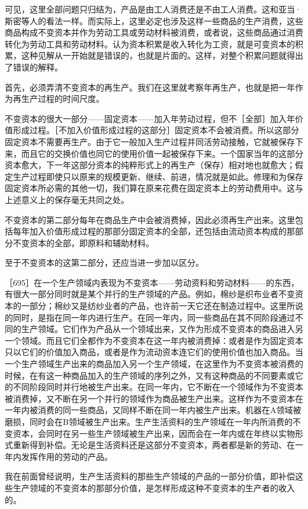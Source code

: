 可见，这里全部问题只归结为，产品是由工人消费还是不由工人消费。这和亚当·斯密等人的看法一样。而实际上，这里必定也涉及这样一些商品的生产消费，这些商品构成不变资本并作为劳动工具或劳动材料被消费，或者说，这些商品通过消费转化为劳动工具和劳动材料。认为资本积累是收入转化为工资，就是可变资本的积累，这种见解从一开始就是错误的，也就是片面的。这样，对整个积累问题就得出了错误的解释。

首先，必须弄清不变资本的再生产。我们在这里就考察年再生产，也就是把一年作为再生产过程的时间尺度。

不变资本的很大一部分——固定资本——加入年劳动过程，但不［全部］加入年价值形成过程。［不加入价值形成过程的这部分］固定资本不会被消费。所以这部分固定资本不需要再生产。由于它一般加入生产过程并同活劳动接触，它就被保存下来，而且它的交换价值也同它的使用价值一起被保存下来。一个国家当年的这部分资本愈大，下一年这部分资本的纯粹形式上的再生产（保存）相对地也就愈大；假定生产过程即使只以原来的规模更新、继续、前进，情况就是如此。修理和为保存固定资本所必需的其他一切，我们算在原来花费在固定资本上的劳动费用中。这与上述意义上的保存毫无共同之处。

不变资本的第二部分每年在商品生产中会被消费掉，因此必须再生产出来。这里包括每年加入价值形成过程的那部分固定资本的全部，还包括由流动资本构成的那部分不变资本的全部，即原料和辅助材料。

至于不变资本的这第二部分，还应当进一步加以区分。

［695］在一个生产领域内表现为不变资本——劳动资料和劳动材料——的东西，有很大一部分同时就是某个并行的生产领域的产品。例如，棉纱是织布业者不变资本的一部分；棉纱又是纺纱业者的产品，也许前一天它还在制造过程中。这里所说的同时，是指在同一年内进行生产。在同一年内，同一些商品在其不同阶段通过不同的生产领域。它们作为产品从一个领域出来，又作为形成不变资本的商品进入另一个领域。而且它们全都作为不变资本在这一年内被消费掉：或者是作为固定资本只以它们的价值加入商品，或者是作为流动资本连它们的使用价值也加入商品。当一个生产领域生产出来的商品加入另一个生产领域，在这里作为不变资本被消费的时候，在有这一种商品加入的生产领域的序列之外，又有这种商品的不同要素或它的不同阶段同时并行地被生产出来。在同一年内，它不断在一个领域作为不变资本被消费掉，又不断在另一个并行的领域作为商品被生产出来。这样作为不变资本在一年内被消费的同一些商品，又同样不断在同一年内被生产出来。机器在A领域被磨损，同时会在B领域被生产出来。生产生活资料的生产领域在一年内所消费的不变资本，会同时在另一些生产领域被生产出来，因而会在一年内或在年终以实物形式重新得到补偿。无论是生活资料还是这部分不变资本，两者都是新的劳动、在一年内发挥作用的劳动的产品。

我在前面曾经说明，生产生活资料的那些生产领域的产品的一部分价值，即补偿这些生产领域的不变资本的那部分价值，是怎样形成这种不变资本的生产者的收入的。

